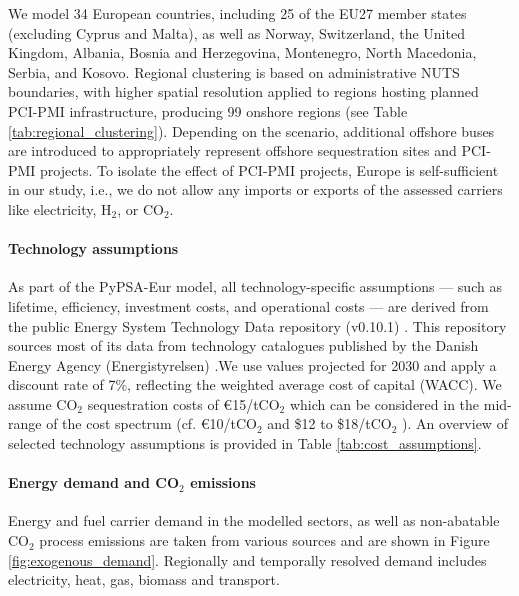 \documentclass[pdflatex,sn-nature]{sn-jnl}%
\theoremstyle{thmstyleone}%
\theoremstyle{thmstyletwo}%
\theoremstyle{thmstylethree}%
\begin{document}
We model 34 European countries, including 25 of the EU27 member states (excluding Cyprus and Malta), as well as Norway, Switzerland, the United Kingdom, Albania, Bosnia and Herzegovina, Montenegro, North Macedonia, Serbia, and Kosovo. Regional clustering is based on administrative NUTS boundaries, with higher spatial resolution applied to regions hosting planned PCI-PMI infrastructure, producing 99 onshore regions (see Table \ref{tab:regional_clustering}). Depending on the scenario, additional offshore buses are introduced to appropriately represent offshore sequestration sites and PCI-PMI projects. To isolate the effect of PCI-PMI projects, Europe is self-sufficient in our study, i.e., we do not allow any imports or exports of the assessed carriers like electricity, H$_2$, or CO$_2$. 

\paragraph{Technology assumptions}
As part of the PyPSA-Eur model, all technology-specific assumptions --- such as lifetime, efficiency, investment costs, and operational costs --- are derived from the public Energy System Technology Data repository (v0.10.1) \cite{zeyenPyPSATechnologydataV01012025}. This repository sources most of its data from technology catalogues published by the Danish Energy Agency (Energistyrelsen) \cite{energistyrelsendanishenergyagencyTechnologyCatalogues2024}.We use values projected for 2030 and apply a discount rate of 7\%, reflecting the weighted average cost of capital (WACC). We assume CO$_2$ sequestration costs of €15/tCO$_2$ which can be considered in the mid-range of the cost spectrum (cf. €10/tCO$_2$ \cite{hofmannH2CO2Network2025} and \$12 to \$18/tCO$_2$ \cite{rubinCostCO2Capture2015}). An overview of selected technology assumptions is provided in Table \ref{tab:cost_assumptions}.

\paragraph{Energy demand and CO$_2$ emissions}
Energy and fuel carrier demand in the modelled sectors, as well as non-abatable CO$_2$ process emissions are taken from various sources \cite{mantzosJRCIDEES20152018,eurostatCompleteEnergyBalances2022,manzGeoreferencedIndustrialSites2018,muehlenpfordtTimeSeries2019,krienOemofDemandlibV0222025} and are shown in Figure \ref{fig:exogenous_demand}. Regionally and temporally resolved demand includes electricity, heat, gas, biomass and transport. 
\end{document}
